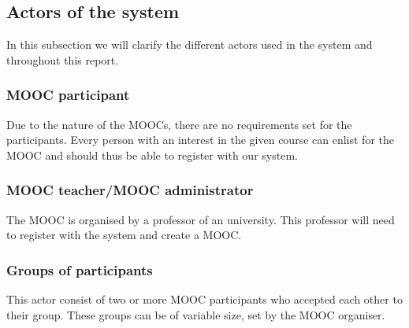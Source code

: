 \documentclass[]{article}
\begin{document}
\subsection{Actors of the system}
In this subsection we will clarify the different actors used in the system and throughout this report.
\subsubsection{MOOC participant}
Due to the nature of the MOOCs, there are no requirements set for the participants.
Every person with an interest in the given course can enlist for the MOOC and should thus be able to register with our system.
\subsubsection{MOOC teacher/MOOC administrator} 
The MOOC is organised by a professor of an university.
This professor will need to register with the system and create a MOOC.
\subsubsection{Groups of participants}
This actor consist of two or more MOOC participants who accepted each other to their group.
These groups can be of variable size, set by the MOOC organiser.
\end{document}
